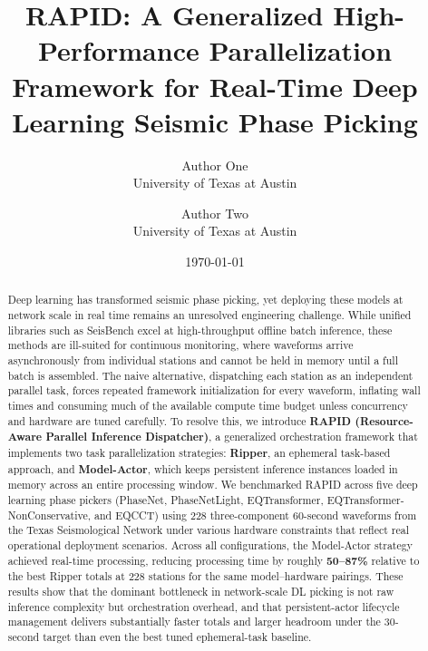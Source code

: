\documentclass[11pt]{article}
\title{RAPID: A Generalized High-Performance Parallelization Framework for Real-Time Deep Learning Seismic Phase Picking}
\author{Author One \\ University of Texas at Austin \and Author Two \\ University of Texas at Austin}
\date{\today}
\begin{document}
\maketitle

\begin{abstract}
Deep learning has transformed seismic phase picking, yet deploying these models at network scale in real time remains an unresolved engineering challenge. While unified libraries such as SeisBench excel at high-throughput offline batch inference, these methods are ill-suited for continuous monitoring, where waveforms arrive asynchronously from individual stations and cannot be held in memory until a full batch is assembled. The naive alternative, dispatching each station as an independent parallel task, forces repeated framework initialization for every waveform, inflating wall times and consuming much of the available compute time budget unless concurrency and hardware are tuned carefully. To resolve this, we introduce \textbf{RAPID (Resource-Aware Parallel Inference Dispatcher)}, a generalized orchestration framework that implements two task parallelization strategies: \textbf{Ripper}, an ephemeral task-based approach, and \textbf{Model-Actor}, which keeps persistent inference instances loaded in memory across an entire processing window. We benchmarked RAPID across five deep learning phase pickers (PhaseNet, PhaseNetLight, EQTransformer, EQTransformer-NonConservative, and EQCCT) using 228 three-component 60-second waveforms from the Texas Seismological Network under various hardware constraints that reflect real operational deployment scenarios. Across all configurations, the Model-Actor strategy achieved real-time processing, reducing processing time by roughly \textbf{50--87\%} relative to the best Ripper totals at 228 stations for the same model--hardware pairings. These results show that the dominant bottleneck in network-scale DL picking is not raw inference complexity but orchestration overhead, and that persistent-actor lifecycle management delivers substantially faster totals and larger headroom under the 30-second target than even the best tuned ephemeral-task baseline.
\end{abstract}



\appendix

\end{document}
